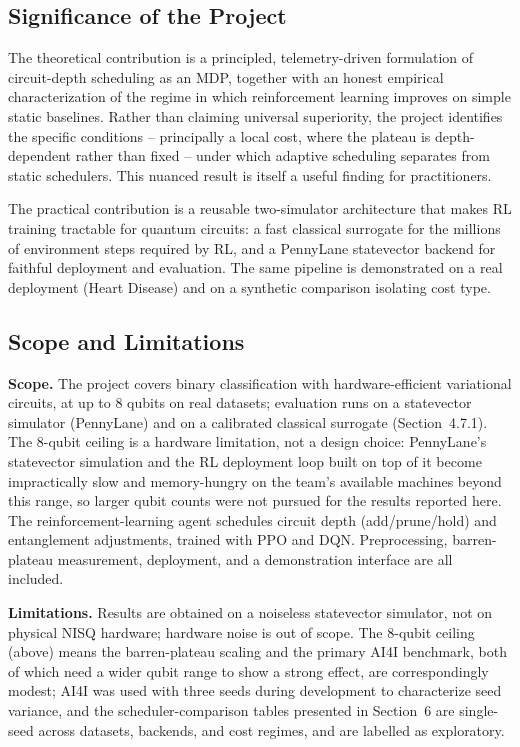 \subsection{Significance of the Project}
The theoretical contribution is a principled, telemetry-driven formulation of circuit-depth scheduling as an MDP, together with an honest empirical characterization of the regime in which reinforcement learning improves on simple static baselines. Rather than claiming universal superiority, the project identifies the specific conditions -- principally a local cost, where the plateau is depth-dependent rather than fixed -- under which adaptive scheduling separates from static schedulers. This nuanced result is itself a useful finding for practitioners.

The practical contribution is a reusable two-simulator architecture that makes RL training tractable for quantum circuits: a fast classical surrogate for the millions of environment steps required by RL, and a PennyLane statevector backend for faithful deployment and evaluation. The same pipeline is demonstrated on a real deployment (Heart Disease) and on a synthetic comparison isolating cost type.

\subsection{Scope and Limitations}
\textbf{Scope.} The project covers binary classification with hardware-efficient variational circuits, at up to 8 qubits on real datasets; evaluation runs on a statevector simulator (PennyLane) and on a calibrated classical surrogate (Section~4.7.1). The 8-qubit ceiling is a hardware limitation, not a design choice: PennyLane's statevector simulation and the RL deployment loop built on top of it become impractically slow and memory-hungry on the team's available machines beyond this range, so larger qubit counts were not pursued for the results reported here. The reinforcement-learning agent schedules circuit depth (add/prune/hold) and entanglement adjustments, trained with PPO and DQN. Preprocessing, barren-plateau measurement, deployment, and a demonstration interface are all included.

\textbf{Limitations.} Results are obtained on a noiseless statevector simulator, not on physical NISQ hardware; hardware noise is out of scope. The 8-qubit ceiling (above) means the barren-plateau scaling and the primary AI4I benchmark, both of which need a wider qubit range to show a strong effect, are correspondingly modest; AI4I was used with three seeds during development to characterize seed variance, and the scheduler-comparison tables presented in Section~6 are single-seed across datasets, backends, and cost regimes, and are labelled as exploratory.

